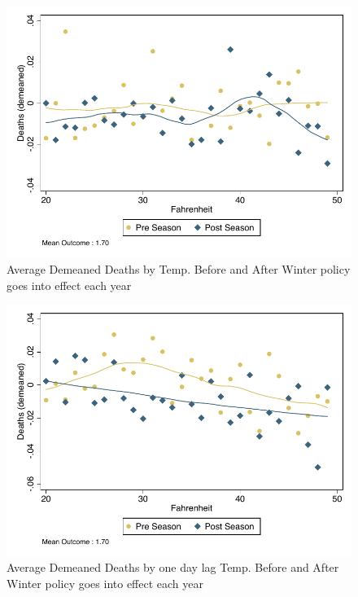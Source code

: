 \documentclass[12pt]{article}
\begin{document}
\begin{figure}
\centering
\caption{Average Demeaned Deaths by Temp. Before and After Winter policy goes into effect each year}
\includegraphics[scale=.8]{figures/tgrad_deaths_all.pdf}
\end{figure}


\begin{figure}
\centering
\caption{Average Demeaned Deaths by one day lag Temp. Before and After Winter policy goes into effect each year}
\includegraphics[scale=.8]{figures/tgrad_deaths_all_lag1.pdf}
\end{figure}
\end{document}
